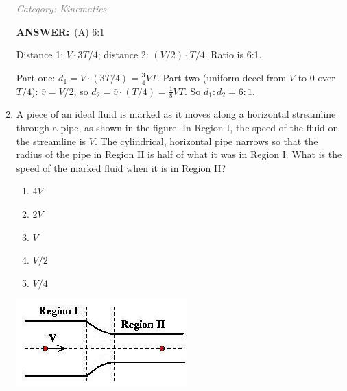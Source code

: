 \documentclass[12pt, a4paper]{article}
\makeatletter
\newcommand{\finalanswer}[1]{\textbf{ANSWER:}~#1}
\newif\if@categoryprinted
\newcommand{\category}[1]{\if@categoryprinted\relax\else\textit{\textcolor{gray}{Category: #1}}\global\@categoryprintedtrue\fi}
\newcommand{\tags}[1]{}
\makeatother
\begin{document}
\begin{CJK*}{UTF8}{gbsn}
\begin{enumerate}[itemsep=1.0em, topsep=0.6em]
\category{Kinematics} \tags{}
\begin{answerbox}
\finalanswer{(A) 6:1}
\end{answerbox}
\begin{insightbox}
Distance 1: $V\cdot 3T/4$; distance 2: $(V/2)\cdot T/4$. Ratio is 6:1.
\end{insightbox}
\begin{solutionbox}

Part one: $d_1=V\cdot (3T/4)=\tfrac{3}{4}VT$. Part two (uniform decel from $V$ to 0 over $T/4$): $\bar v = V/2$, so $d_2=\bar v\cdot (T/4)=\tfrac{1}{8}VT$. So $d_1:d_2=6:1$.
\end{solutionbox}

\newpage

\item \label{prob:11}
\noindent\begin{minipage}[t]{0.6\linewidth}
\vspace{0pt}
A piece of an ideal fluid is marked as it moves along a horizontal streamline through a pipe, as shown in the figure. In Region I, the speed of the fluid on the streamline is $V$. The cylindrical, horizontal pipe narrows so that the radius of the pipe in Region II is half of what it was in Region I. What is the speed of the marked fluid when it is in Region II?
\begin{enumerate}[label=(\Alph*)]
    \item 4$V$
    \item 2$V$
    \item $V$
    \item $V/2$
    \item $V/4$
\end{enumerate}
\end{minipage}%
\hfill
\begin{minipage}[t]{0.35\linewidth}
\vspace{0pt}
\centering
\includegraphics[width=\linewidth]{Problem_11_Figure.png}
\end{minipage}


\end{enumerate}
\end{CJK*}
\end{document}
